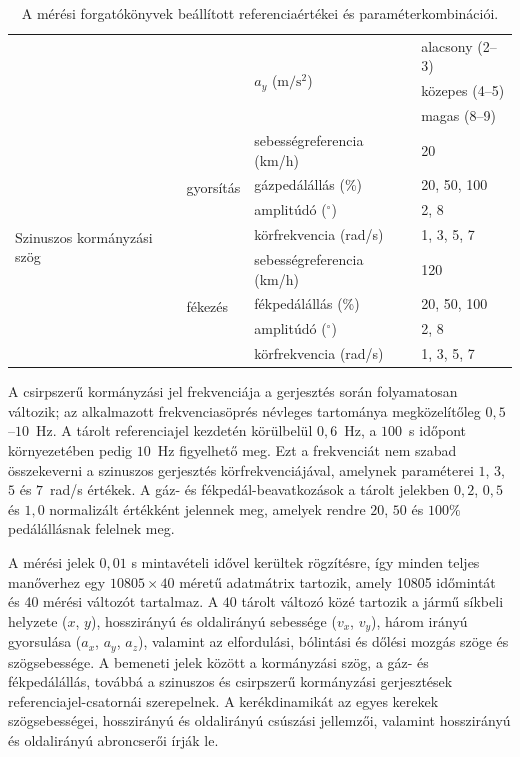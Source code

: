 \documentclass[12pt,a4paper,onehalfspacing, oneside]{book} %
\begin{document}
\begin{table}[htb!]
\begin{center}
\begin{tabular}{llll}
\multicolumn{1}{l|}{} & \multicolumn{1}{l|}{} & \multirow{3}{*}{$a_y$ ($\mathrm{m/s^2}$)} & alacsony (2--3) \\
\multicolumn{1}{l|}{} & \multicolumn{1}{l|}{} & & közepes (4--5) \\
\multicolumn{1}{l|}{} & \multicolumn{1}{l|}{} & & magas (8--9) \\ \hline
\multicolumn{1}{l|}{\multirow{8}{*}{Szinuszos kormányzási szög}} & \multicolumn{1}{l|}{\multirow{4}{*}{gyorsítás}} & sebességreferencia (km/h) & 20 \\
\multicolumn{1}{l|}{} & \multicolumn{1}{l|}{} & gázpedálállás (\%) & 20, 50, 100 \\
\multicolumn{1}{l|}{} & \multicolumn{1}{l|}{} & amplitúdó ($^\circ$) & 2, 8 \\
\multicolumn{1}{l|}{} & \multicolumn{1}{l|}{} & körfrekvencia (rad/s) & 1, 3, 5, 7 \\ \cline{2-4}
\multicolumn{1}{l|}{} & \multicolumn{1}{l|}{\multirow{4}{*}{fékezés}} & sebességreferencia (km/h) & 120 \\
\multicolumn{1}{l|}{} & \multicolumn{1}{l|}{} & fékpedálállás (\%) & 20, 50, 100 \\
\multicolumn{1}{l|}{} & \multicolumn{1}{l|}{} & amplitúdó ($^\circ$) & 2, 8 \\
\multicolumn{1}{l|}{} & \multicolumn{1}{l|}{} & körfrekvencia (rad/s) & 1, 3, 5, 7 \\ \hline \hline
\end{tabular}
\caption{A mérési forgatókönyvek beállított referenciaértékei és paraméterkombinációi.}
\label{manover-parameterek}
\end{center}
\end{table}

A csirpszerű kormányzási jel frekvenciája a gerjesztés során folyamatosan változik; az alkalmazott frekvenciasöprés névleges tartománya megközelítőleg $0{,}5$--$10$~Hz. A tárolt referenciajel kezdetén körülbelül $0{,}6$~Hz, a $100$~s időpont környezetében pedig $10$~Hz figyelhető meg. Ezt a frekvenciát nem szabad összekeverni a szinuszos gerjesztés körfrekvenciájával, amelynek paraméterei $1$, $3$, $5$ és $7$~rad/s értékek. A gáz- és fékpedál-beavatkozások a tárolt jelekben $0{,}2$, $0{,}5$ és $1{,}0$ normalizált értékként jelennek meg, amelyek rendre $20$, $50$ és $100\%$ pedálállásnak felelnek meg.

A mérési jelek $0{,}01$ s mintavételi idővel kerültek rögzítésre, így minden teljes manőverhez egy $10805\times40$ méretű adatmátrix tartozik, amely 10805 időmintát és 40 mérési változót tartalmaz. A $40$ tárolt változó közé tartozik a jármű síkbeli helyzete ($x$, $y$), hosszirányú és oldalirányú sebessége ($v_x$, $v_y$), három irányú gyorsulása ($a_x$, $a_y$, $a_z$), valamint az elfordulási, bólintási és dőlési mozgás szöge és szögsebessége. A bemeneti jelek között a kormányzási szög, a gáz- és fékpedálállás, továbbá a szinuszos és csirpszerű kormányzási gerjesztések referenciajel-csatornái szerepelnek. A kerékdinamikát az egyes kerekek szögsebességei, hosszirányú és oldalirányú csúszási jellemzői, valamint hosszirányú és oldalirányú abroncserői írják le.
\end{document}
